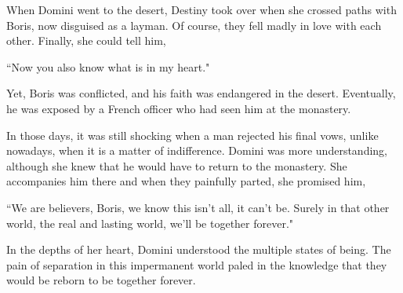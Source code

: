 When Domini went to the desert, Destiny took over when she crossed paths with Boris, now disguised as a layman. Of course, they fell madly in love with each other. Finally, she could tell him,

\begin{quotex}
``Now you also know what is in my heart."

\end{quotex}
Yet, Boris was conflicted, and his faith was endangered in the desert. Eventually, he was exposed by a French officer who had seen him at the monastery.

In those days, it was still shocking when a man rejected his final vows, unlike nowadays, when it is a matter of indifference. Domini was more understanding, although she knew that he would have to return to the monastery. She accompanies him there and when they painfully parted, she promised him,

\begin{quotex}
``We are believers, Boris, we know this isn't all, it can't be. Surely in that other world, the real and lasting world, we'll be together forever."

\end{quotex}
In the depths of her heart, Domini understood the multiple states of being. The pain of separation in this impermanent world paled in the knowledge that they would be reborn to be together forever.



